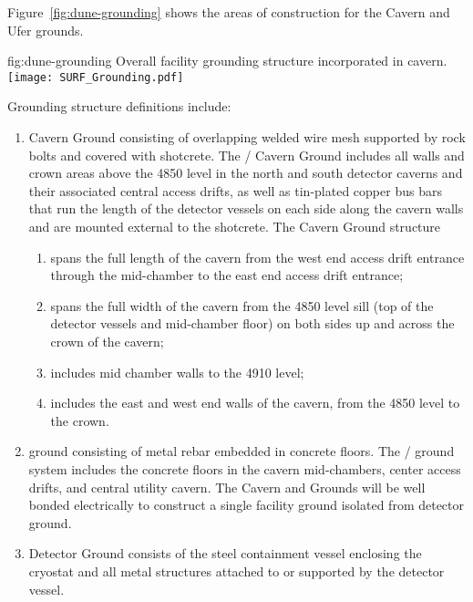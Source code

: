 Figure~\ref{fig:dune-grounding} shows the areas of construction for
the Cavern and Ufer grounds.
\begin{dunefigure}{fig:dune-grounding}
  {Overall  facility grounding structure incorporated in cavern.}
  \texttt{[image: SURF\_Grounding.pdf]}
\end{dunefigure}
Grounding structure definitions include:
\begin{enumerate}
 \item Cavern Ground consisting of overlapping welded wire mesh
   supported by rock bolts and covered with shotcrete. The
   / Cavern Ground includes all walls and
   crown areas above the 4850 level in the north and south detector
   caverns and their associated central access drifts, as well as tin-plated
   copper bus bars that run the length of the detector vessels
   on each side along the cavern walls and are mounted external to the
   shotcrete.  The Cavern Ground structure
\begin{enumerate}
 \item spans the full length of the cavern from the west end access
   drift entrance through the mid-chamber to the east end access drift
   entrance;
 \item spans the full width of the cavern from the 4850 level sill
   (top of the detector vessels and mid-chamber floor) on both sides
   up and across the crown of the cavern;
 \item includes mid chamber walls to the 4910 level;
 \item includes the east and west end walls of the cavern, from the
   4850 level to the crown.
\end{enumerate}
 \item {} ground consisting of metal rebar embedded in
   concrete floors. The /  ground
   system includes the concrete floors in the cavern mid-chambers,
   center access drifts, and central utility cavern. The Cavern and
    Grounds will be well bonded electrically to construct
   a single facility ground isolated from detector ground.
 \item Detector Ground consists of the steel containment vessel
   enclosing the cryostat and all metal structures attached to or
   supported by the detector vessel.
\end{enumerate}


